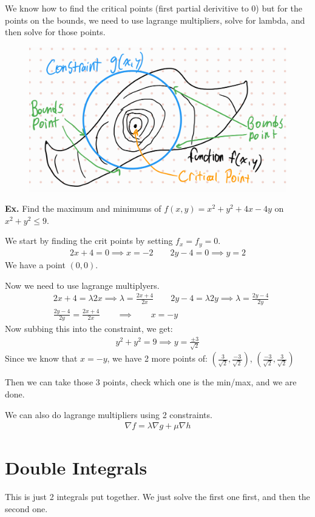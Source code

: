 \documentclass[12pt,letterpaper]{article} \usepackage{amsmath} \usepackage{graphicx} \usepackage[margin=1in]{geometry} \usepackage{longtable}  \usepackage{amssymb}
\begin{document}
	We know how to find the critical points (first partial derivitive to 0) but for the points on the bounds, we need to use lagrange multipliers, solve for lambda, and then solve for those points. 
	\begin{figure}[H]
		\centering
		\includegraphics[width=0.5\linewidth]{lagrange.png}
	\end{figure}

	\begin{mdframed}[]
		\textbf{Ex. } Find the maximum and minimums of $f(x,y) = x^2+y^2 +4x-4y$ on $x^2+y^2\le 9$.
		
		We start by finding the crit points by setting $f_x=f_y=0$.
		\begin{align*}
			2x+4=0 \implies x=-2 \qquad 2y-4 = 0 \implies y=2
		\end{align*}
		We have a point $(0,0)$.
		
		Now we need to use lagrange multiplyers. 
		\begin{align*}
			& 2x+4 = \lambda 2x \implies \lambda = \frac{2x+4}{2x} \qquad 2y-4 = \lambda 2y \implies \lambda = \frac{2y-4}{2y}\\
			& \frac{2y-4}{2y} = \frac{2x+4}{2x} \qquad \implies \qquad x=-y
		\end{align*}
		Now subbing this into the constraint, we get:
		\begin{align*}
			y^2 + y^2 = 9 \implies y=\frac{\pm 3}{\sqrt{2}}
		\end{align*}
		Since we know that $x=-y$, we have 2 more points of: $\left(\frac{3}{\sqrt{2}},\frac{-3}{\sqrt{2}}\right)$, $\left(\frac{-3}{\sqrt{2}},\frac{3}{\sqrt{2}}\right)$
		
		Then we can take those 3 points, check which one is the min/max, and we are done.
	\end{mdframed}

	We can also do lagrange multipliers using 2 constraints.
	\begin{align*}
		\nabla f = \lambda \nabla g + \mu \nabla h
	\end{align*}
	
	\section{Double Integrals}
	This is just 2 integrals put together. We just solve the first one first, and then the second one. 
	
\end{document}
